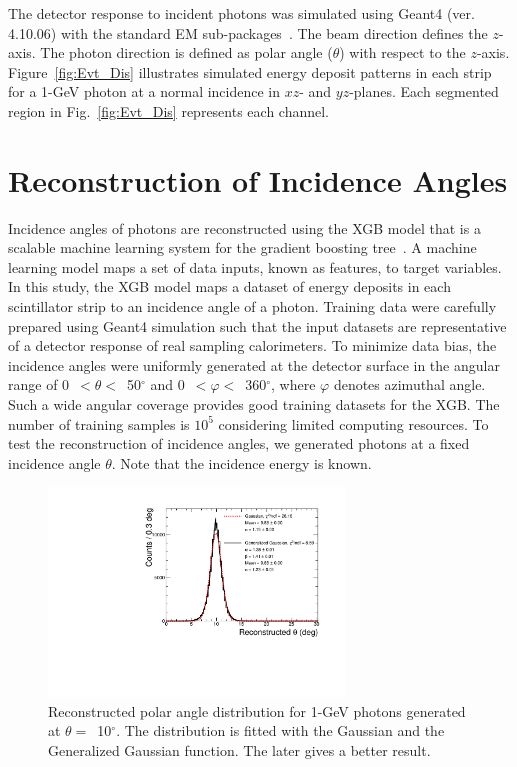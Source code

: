 \documentclass[preprint,12pt,times,a4paper]{elsarticle}
\begin{document}
The detector response to incident photons was simulated using Geant4 (ver. 4.10.06) with the standard EM sub-packages~\cite{GEANT4}. The beam direction defines the $z$-axis. The photon direction is defined as polar angle ($\theta$) with respect to the $z$-axis. Figure~\ref{fig:Evt_Dis} illustrates simulated energy deposit patterns in each strip for a 1-GeV photon at a normal incidence in $xz$- and $yz$-planes. Each segmented region in Fig.~\ref{fig:Evt_Dis} represents each channel.

\section{Reconstruction of Incidence Angles}
\label{sec:res}

Incidence angles of photons are reconstructed using the XGB model that is a scalable machine learning system for the gradient boosting tree~\cite{xgboost:2016}. A machine learning model maps a set of data inputs, known as features, to target variables. In this study, the XGB model maps a dataset of energy deposits in each scintillator strip to an incidence angle of a photon. Training data were carefully prepared using Geant4 simulation such that the input datasets are representative of a detector response of real sampling calorimeters. To minimize 
data bias, the incidence angles were uniformly generated at the detector surface in the angular range of 0~$<\theta<$~50$^{\circ}$ and 0~$<\varphi<$~360$^{\circ}$, where $\varphi$ denotes azimuthal angle. Such a wide angular coverage provides good training datasets for the XGB. The number of training samples is $10^{5}$ considering limited computing resources. To test the reconstruction of incidence angles, we generated photons at a fixed incidence angle $\theta$. Note that the incidence energy is known.

\begin{figure}[!hbt]
\centering
\includegraphics[width=0.7\textwidth]{figures/Fig3_fit_GG.pdf}
\caption{ Reconstructed polar angle distribution for 1-GeV photons generated at $\theta=$~10$^{\circ}$. The distribution is fitted with the Gaussian and the Generalized Gaussian function. The later gives a better result.}
\label{fig:angle_10degree}
\end{figure}
\end{document}
